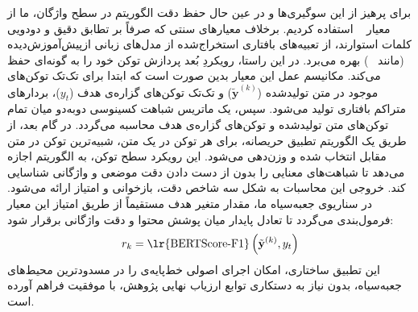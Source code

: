 برای پرهیز از این سوگیری‌ها و در عین حال حفظ دقت الگوریتم در سطح واژگان، ما از معیار ~\cite{zhang2020bertscore} استفاده کردیم. برخلاف معیارهای سنتی که صرفاً بر تطابق دقیق و دودویی کلمات استوارند،  از تعبیه‌های بافتاری استخراج‌شده از مدل‌های زبانی از‌پیش‌آموزش‌دیده (مانند ~\cite{liu2021roberta}) بهره می‌برد. در این راستا، رویکردِ بُعد پردازش توکن خود را به گونه‌ای حفظ می‌کند. مکانیسم عمل این معیار بدین صورت است که ابتدا برای تک‌تک توکن‌های موجود در متن تولیدشده ($\tilde{\mathbf{y}}^{(k)}$) و تک‌تک توکن‌های گزاره‌ی هدف ($y_t$)، بردارهای متراکم بافتاری تولید می‌شود. سپس، یک ماتریس شباهت کسینوسی دوبه‌دو میان تمام توکن‌های متن تولیدشده و توکن‌های گزاره‌ی هدف محاسبه می‌گردد. در گام بعد، از طریق یک الگوریتم تطبیق حریصانه، برای هر توکن در یک متن، شبیه‌ترین توکن در متن مقابل انتخاب شده و وزن‌دهی می‌شود. این رویکرد سطح توکن، به الگوریتم اجازه می‌دهد تا شباهت‌های معنایی را بدون از دست دادن دقت موضعی و واژگانی شناسایی کند. خروجی این محاسبات به شکل سه شاخص دقت، بازخوانی و امتیاز  ارائه می‌شود. در سناریوی جعبه‌سیاه ما، مقدار متغیر هدف مستقیماً از طریق امتیاز  این معیار فرمول‌بندی می‌گردد تا تعادل پایدار میان پوشش محتوا و دقت واژگانی برقرار شود:
\begin{equation}\label{eq:app_lime_blackbox_target}
    r_k = \text{\lr{BERTScore-F1}}\left( \tilde{\mathbf{y}}^{(k)}, y_t \right)
\end{equation}
این تطبیق ساختاری، امکان اجرای اصولی خط‌پایه‌ی  را در مسدودترین محیط‌های جعبه‌سیاه، بدون نیاز به دستکاری توابع ارزیاب نهایی پژوهش، با موفقیت فراهم آورده است.
